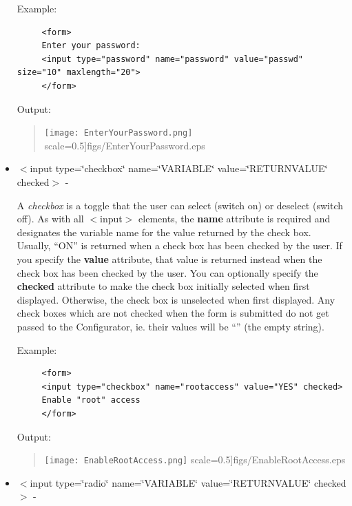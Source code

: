 \begin{itemize}
Example:

\begin{footnotesize}
\begin{verbatim}
     <form> 
     Enter your password: 
     <input type="password" name="password" value="passwd" size="10" maxlength="20"> 
     </form>
\end{verbatim}
\end{footnotesize}

Output: 

\begin{quote}
\texttt{[image: EnterYourPassword.png]}
  scale=0.5]{figs/EnterYourPassword.eps}
\end{quote}
\item $<$input type=\char`\"{}checkbox\char`\"{} name=\char`\"{}VARIABLE\char`\"{}
value=\char`\"{}RETURNVALUE\char`\"{} checked$>$ - 


A \textit{checkbox} is a toggle that the user can select (switch on)
or deselect (switch off). As with all $<$input$>$ elements, the \textbf{name}
attribute is required and designates the variable name for the value
returned by the check box. Usually, {}``ON'' is returned when a
check box has been checked by the user. If you specify the \textbf{value}
attribute, that value is returned instead when the check box has been
checked by the user. You can optionally specify the \textbf{checked}
attribute to make the check box initially selected when first displayed.
Otherwise, the check box is unselected when first displayed. Any check
boxes which are not checked when the form is submitted do not get
passed to the Configurator, ie. their values will be {}``'' (the
empty string).

Example:

\begin{footnotesize}
\begin{verbatim}
     <form> 
     <input type="checkbox" name="rootaccess" value="YES" checked> 
     Enable "root" access 
     </form>
\end{verbatim}
\end{footnotesize}

Output: 

\begin{quote}
\texttt{[image: EnableRootAccess.png]}
  scale=0.5]{figs/EnableRootAccess.eps}
\end{quote}
\item $<$input type=\char`\"{}radio\char`\"{} name=\char`\"{}VARIABLE\char`\"{}
value=\char`\"{}RETURNVALUE\char`\"{} checked$>$ - 



\end{itemize}
